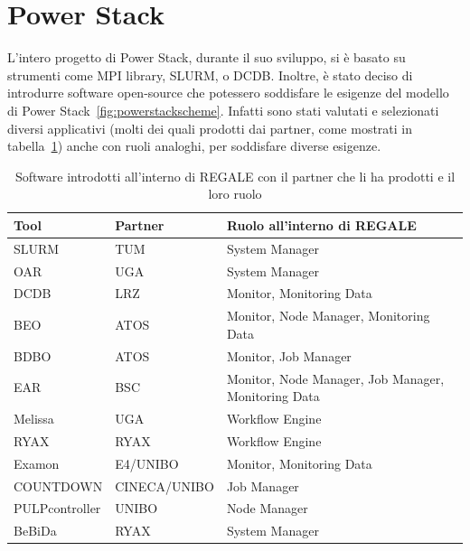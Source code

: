 \section{Power Stack}
L'intero progetto di Power Stack, durante il suo sviluppo, si è basato su strumenti come MPI library\cite{mpi}, SLURM\cite{slurm}, o DCDB\cite{dcdb}. Inoltre, è stato deciso di introdurre software open-source che potessero soddisfare le esigenze del modello di Power Stack~\ref{fig:powerstackscheme}. Infatti sono stati valutati e selezionati diversi applicativi (molti dei quali prodotti dai partner, come mostrati in tabella~\ref{table:REGALE}) anche con ruoli analoghi, per soddisfare diverse esigenze.
\begin{table}[ht]
    \centering
    \begin{tabular}{l|l|l}
    \hline
    \textbf{Tool} & \textbf{Partner} & \textbf{Ruolo all'interno di REGALE} \\
    \hline
    SLURM & TUM & System Manager \\
    \hline
    OAR & UGA & System Manager \\
    \hline
    DCDB & LRZ & Monitor, Monitoring Data \\
    \hline
    BEO & ATOS & Monitor, Node Manager, Monitoring Data \\
    \hline
    BDBO & ATOS & Monitor, Job Manager \\
    \hline
    EAR & BSC & Monitor, Node Manager, Job Manager, Monitoring Data \\
    \hline
    Melissa & UGA & Workflow Engine \\
    \hline
    RYAX & RYAX & Workflow Engine \\
    \hline
    Examon & E4/UNIBO & Monitor, Monitoring Data \\
    \hline
    COUNTDOWN & CINECA/UNIBO & Job Manager \\
    \hline
    PULPcontroller & UNIBO & Node Manager \\
    \hline
    BeBiDa & RYAX & System Manager \\
    \hline
\end{tabular}
\caption{Software introdotti all'interno di REGALE con il partner che li ha prodotti e il loro ruolo}\label{table:REGALE}
\end{table}

